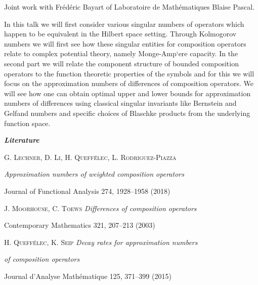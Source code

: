 {
    Joint work with Frédéric Bayart of Laboratoire de Mathématiques Blaise Pascal.

    In this talk we will first consider various singular numbers of operators
    which happen to be equivalent in the Hilbert space setting. Through
    Kolmogorov numbers we will first see how these singular entities for
    composition operators relate to complex potential theory, namely
    Monge-Amp`ere capacity. In the second part we will relate the component
    structure of bounded composition operators to the function theoretic
    properties of the symbols and for this we will focus on the approximation
    numbers of differences of composition operators. We will see how one can
    obtain optimal upper and lower bounds for approximation numbers of
    differences using classical singular invariants like Bernstein and
    Gelfand numbers and specific choices of Blaschke products from the
    underlying function space.

    \bigskip
    \noindent
    \textit{\textbf{\large Literature}}

    \medskip
    \textsc{G. Lechner, D. Li, H. Queffélec, L. Rodriguez-Piazza}
    
    \hfill \textit{Approximation numbers of weighted composition operators}

    \hfill Journal of Functional Analysis 274, 1928–1958 (2018)

    \textsc{J. Moorhouse, C. Toews}
    \hfill \textit{Differences of composition operators}

    \hfill Contemporary Mathematics 321, 207–213 (2003)

    \textsc{H. Queffélec, K. Seip}
    \hfill \textit{Decay rates for approximation numbers}

    \hfill \textit{of composition operators}

    \hfill Journal d’Analyse Mathématique 125, 371–399 (2015)%
}
